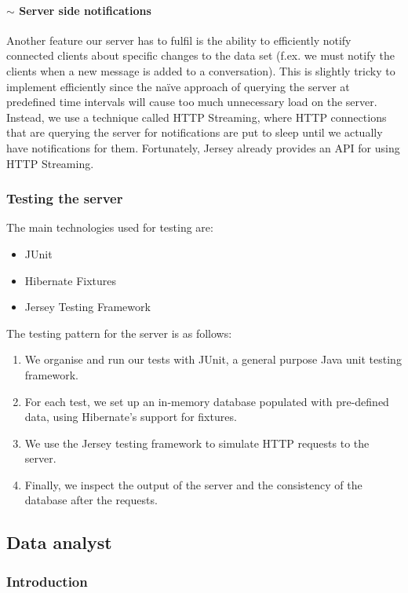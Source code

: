 \documentclass[12p, a4paper, onecolumn]{report}
\begin{document}
\paragraph{$\sim$ Server side notifications}

Another feature our server has to fulfil is the ability to efficiently notify connected clients about specific changes to the data set (f.ex. we must notify the clients when a new message is added to a conversation). This is slightly tricky to implement efficiently since the na\"{i}ve approach of querying the server at predefined time intervals will cause too much unnecessary load on the server. Instead, we use a technique called HTTP Streaming, where HTTP connections that are querying the server for notifications are put to sleep until we actually have notifications for them. Fortunately, Jersey already provides an API for using HTTP Streaming.

\subsubsection{Testing the server}

The main technologies used for testing are:
\begin{itemize}
\item JUnit
\item Hibernate Fixtures
\item Jersey Testing Framework
\end{itemize}
The testing pattern for the server is as follows:
\begin{enumerate}
\item We organise and run our tests with JUnit, a general purpose Java unit testing framework.
\item For each test, we set up an in-memory database populated with pre-defined data, using Hibernate's support for fixtures.
\item We use the Jersey testing framework to simulate HTTP requests to the server.
\item Finally, we inspect the output of the server and the consistency of the database after the requests.
\end{enumerate}

\subsection{Data analyst}

\subsubsection{Introduction}
\end{document}
